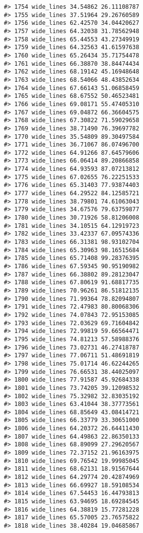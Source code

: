 \documentclass[
]{book}
\theoremstyle{definition}
\theoremstyle{definition}
\theoremstyle{definition}
\theoremstyle{definition}
\theoremstyle{remark}
\begin{document}
\begin{verbatim}
#> 1754 wide_lines 34.54862 26.11108787
#> 1755 wide_lines 37.51964 29.26760589
#> 1756 wide_lines 62.42570 34.04420627
#> 1757 wide_lines 64.32038 31.78562948
#> 1758 wide_lines 65.44553 43.27349919
#> 1759 wide_lines 64.32563 41.61597638
#> 1760 wide_lines 65.26434 35.71754478
#> 1761 wide_lines 66.38870 38.84474434
#> 1762 wide_lines 68.19142 45.16948648
#> 1763 wide_lines 68.54066 48.43852634
#> 1764 wide_lines 67.66143 51.06858459
#> 1765 wide_lines 68.67552 50.46523481
#> 1766 wide_lines 69.08171 55.47405310
#> 1767 wide_lines 69.04872 66.36604575
#> 1768 wide_lines 67.30822 71.59029658
#> 1769 wide_lines 38.71490 76.39697782
#> 1770 wide_lines 35.54809 89.30497584
#> 1771 wide_lines 36.71067 86.07496700
#> 1772 wide_lines 64.91266 87.64579606
#> 1773 wide_lines 66.06414 89.20866858
#> 1774 wide_lines 64.93593 87.07213812
#> 1775 wide_lines 67.02655 76.22251533
#> 1776 wide_lines 65.31403 77.93874403
#> 1777 wide_lines 64.29522 84.12585721
#> 1778 wide_lines 38.79801 74.61063043
#> 1779 wide_lines 34.67576 79.63759877
#> 1780 wide_lines 30.71926 58.81206008
#> 1781 wide_lines 34.10515 64.12919723
#> 1782 wide_lines 33.42337 67.09574336
#> 1783 wide_lines 66.31381 98.93102704
#> 1784 wide_lines 65.30963 98.16515684
#> 1785 wide_lines 65.71408 99.28376395
#> 1786 wide_lines 67.59345 90.95190982
#> 1787 wide_lines 66.38802 89.28123047
#> 1788 wide_lines 67.80619 91.68817735
#> 1789 wide_lines 70.96261 86.51812135
#> 1790 wide_lines 71.99364 78.82094807
#> 1791 wide_lines 72.47983 80.80068306
#> 1792 wide_lines 74.07843 72.95153085
#> 1793 wide_lines 72.03629 69.71604842
#> 1794 wide_lines 72.99819 59.66564471
#> 1795 wide_lines 74.81213 57.58988376
#> 1796 wide_lines 73.02731 46.27418787
#> 1797 wide_lines 77.06711 51.48691819
#> 1798 wide_lines 75.01714 46.62244265
#> 1799 wide_lines 76.66531 38.44025097
#> 1800 wide_lines 77.91587 45.92684338
#> 1801 wide_lines 73.74205 39.12098532
#> 1802 wide_lines 75.32982 32.83035192
#> 1803 wide_lines 63.41044 38.37773561
#> 1804 wide_lines 68.85649 43.08414721
#> 1805 wide_lines 66.33779 33.30651000
#> 1806 wide_lines 64.20372 26.64411430
#> 1807 wide_lines 64.49863 22.86350133
#> 1808 wide_lines 68.89099 27.29620567
#> 1809 wide_lines 72.37152 21.96163975
#> 1810 wide_lines 69.76542 19.99985045
#> 1811 wide_lines 68.62131 18.91567644
#> 1812 wide_lines 64.29774 20.42874969
#> 1813 wide_lines 66.69927 18.59108534
#> 1814 wide_lines 67.54453 16.44793813
#> 1815 wide_lines 63.94695 18.69284545
#> 1816 wide_lines 64.38819 15.77281228
#> 1817 wide_lines 65.57005 23.76575822
#> 1818 wide_lines 38.40284 19.04685867

\end{verbatim}
\end{document}
